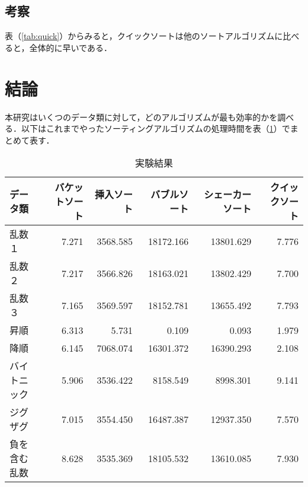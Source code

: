 \documentclass[a4j, titlepage]{jarticle}
\begin{document}
        
        \subsection{考察}
            表（\ref{tab:quick}）からみると，クイックソートは他のソートアルゴリズムに比べると，全体的に早いである．

        
    \section{結論}
        本研究はいくつのデータ類に対して，どのアルゴリズムが最も効率的かを調べる．以下はこれまでやったソーティングアルゴリズムの処理時間を表（\ref{tab:result}）でまとめて表す．

    \begin{table}[h!]
        \caption{実験結果}
        \label{tab:result}
        \begin{center}
            \begin{tabular}{|l|r|r|r|r|r|}
                \hline
                データ類 & バケットソート & 挿入ソート & バブルソート & シェーカーソート & クイックソート \\ \hline
                乱数１     & \cellcolor{green!20}7.271 & 3568.585 & 18172.166 & 13801.629 & 7.776 \\ \hline
                乱数２     & \cellcolor{green!20}7.217 & 3566.826 & 18163.021 & 13802.429 & 7.700 \\ \hline
                乱数３     & \cellcolor{green!20}7.165 & 3569.597 & 18152.781 & 13655.492 & 7.793 \\ \hline
                昇順       & 6.313 & 5.731 & 0.109 &  \cellcolor{green!20}0.093 & 1.979 \\ \hline
                降順       & 6.145 & 7068.074 & 16301.372 & 16390.293 &  \cellcolor{green!20}2.108 \\ \hline
                バイトニック& \cellcolor{green!20}5.906 & 3536.422 & 8158.549 & 8998.301 & 9.141 \\ \hline
                ジグザグ   &  \cellcolor{green!20}7.015 & 3554.450 & 16487.387 & 12937.350 & 7.570 \\ \hline
                負を含む乱数& 8.628 & 3535.369 & 18105.532 & 13610.085 &  \cellcolor{green!20}7.930 \\ \hline
            \end{tabular}
        \end{center}
    \end{table}
\end{document}
